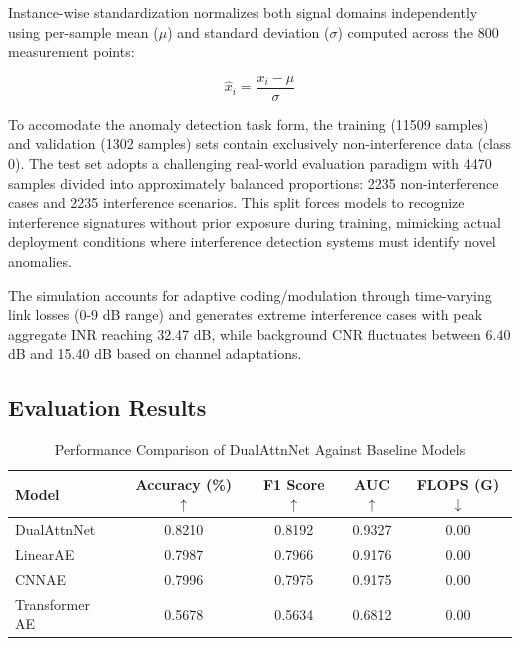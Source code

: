 \documentclass[12pt]{article}
\begin{document}
Instance-wise standardization normalizes both signal domains independently using per-sample mean (\( \mu \)) and standard deviation (\( \sigma \)) computed across the 800 measurement points:

\begin{equation}
    \hat{x}_i = \frac{x_i - \mu}{\sigma}
\end{equation}

To accomodate the anomaly detection task form, the training (11509 samples) and validation (1302 samples) sets contain exclusively non-interference data (class 0). The test set adopts a challenging real-world evaluation paradigm with 4470 samples divided into approximately balanced proportions: 2235 non-interference cases and 2235 interference scenarios. This split forces models to recognize interference signatures without prior exposure during training, mimicking actual deployment conditions where interference detection systems must identify novel anomalies.

The simulation accounts for adaptive coding/modulation through time-varying link losses (0-9 dB range) and generates extreme interference cases with peak aggregate INR reaching 32.47 dB, while background CNR fluctuates between 6.40 dB and 15.40 dB based on channel adaptations.

\subsection{Evaluation Results}

\begin{table}[htbp]
    \caption{Performance Comparison of DualAttnNet Against Baseline Models}
    \label{tab:main_results}
    \centering
    \begin{tabular}{lcccc}
        \toprule
        \textbf{Model} & \textbf{Accuracy (\%) } $\uparrow$ & \textbf{F1 Score} $\uparrow$ & \textbf{AUC}$\uparrow$ & \textbf{FLOPS (G)}$\downarrow$ \\
        \midrule
        DualAttnNet    & 0.8210                             & 0.8192                       & 0.9327                 & 0.00                           \\
        \cmidrule{1-5}
        LinearAE       & 0.7987                             & 0.7966                       & 0.9176                 & 0.00                           \\
        CNNAE          & 0.7996                             & 0.7975                       & 0.9175                 & 0.00                           \\
        Transformer AE & 0.5678                             & 0.5634                       & 0.6812                 & 0.00                           \\
        \bottomrule
    \end{tabular}
\end{table}
\end{document}
